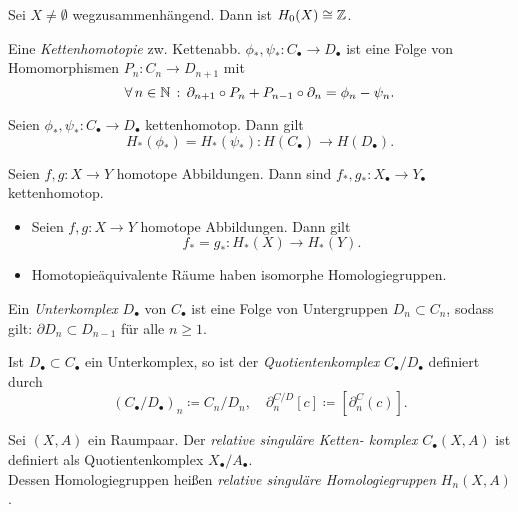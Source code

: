 \documentclass{cheat-sheet}
\newcommand{\CC}[1]{{#1}_{\bullet}} %
\begin{document}
\begin{prop}
  Sei $X \not= \emptyset$ wegzusammenhängend. Dann ist $H_0(X) \cong \mathbb{Z}$.
\end{prop}

\begin{defn}
  Eine \emph{Kettenhomotopie} zw. Kettenabb. $\phi_*, \psi_* : \CC{C} \to \CC{D}$ ist eine Folge von Homomorphismen $P_n : C_n \to D_{n+1}$ mit
  \[ \forall \, {n \in \mathbb{N}} \,:\, \partial_{n+1} \circ P_n + P_{n-1} \circ \partial_n = \phi_n - \psi_n. \]
\end{defn}

\begin{prop}
  Seien $\phi_*, \psi_* : \CC{C} \to \CC{D}$ kettenhomotop. Dann gilt
  \[ H_*(\phi_*) = H_*(\psi_*) : H(\CC{C}) \to H(\CC{D}). \]
\end{prop}

\begin{satz}
  Seien $f, g : X \to Y$ homotope Abbildungen. Dann sind $f_*, g_* : \CC{X} \to \CC{Y}$ kettenhomotop.
\end{satz}

\begin{kor}
  \begin{itemize}
    \item Seien $f, g : X \to Y$ homotope Abbildungen. Dann gilt
    \[ f_* = g_* : H_*(X) \to H_*(Y). \]
    \item Homotopieäquivalente Räume haben isomorphe Homologiegruppen.
  \end{itemize}
\end{kor}



\begin{defn}
  Ein \emph{Unterkomplex} $\CC{D}$ von $\CC{C}$ ist eine Folge von Untergruppen $D_n \subset C_n$, sodass gilt: $\partial D_n \subset D_{n-1}$ für alle $n \geq 1$.
\end{defn}

\begin{defn}
  Ist $\CC{D} \subset \CC{C}$ ein Unterkomplex, so ist der \emph{Quotientenkomplex} $\CC{C}/\CC{D}$ definiert durch
  \[
    (\CC{C}/\CC{D})_n \coloneqq C_n/D_n, \quad
    \partial^{C/D}_n[c] \coloneqq [\partial^C_n(c)].
  \]
\end{defn}

\begin{defn}
  Sei $(X, A)$ ein Raumpaar. Der \emph{relative singuläre Ketten- komplex} $\CC{C}(X, A)$ ist definiert als Quotientenkomplex $\CC{X}/\CC{A}$.\\
  Dessen Homologiegruppen heißen \emph{relative singuläre Homologiegruppen} $H_n(X, A)$.
\end{defn}
\end{document}
